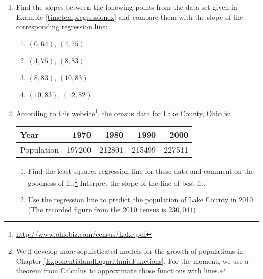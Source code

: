 \begin{enumerate}

\setcounter{enumi}{\value{HW}}

\item  Find the slopes between the following points from the data set given in Example \ref{timetempregressionex} and compare them with the slope of the corresponding regression line:

\begin{multicols}{4}

\begin{enumerate}

\item  $(0, 64)$, $(4, 75)$

\item  $(4, 75)$, $(8, 83)$

\item  $(8, 83)$, $(10, 83)$

\item  $(10, 83)$, $(12, 82)$

\end{enumerate}

\end{multicols}

\item According to this \href{http://www.ohiobiz.com/census/Lake.pdf}{\underline{website}}\footnote{\href{http://www.ohiobiz.com/census/Lake.pdf}{\underline{http://www.ohiobiz.com/census/Lake.pdf}}}, the census data for Lake County, Ohio is:

\noindent \begin{tabular}{|l|r|r|r|r|} \hline
Year & 1970 & 1980 & 1990 & 2000 \\ 
\hline 
Population & 197200 & 212801 & 215499 & 227511 \\ \hline
\end{tabular}

\begin{enumerate}
 

\item  Find the least squares regression line for these data and comment on the goodness of fit.\footnote{We'll develop more sophisticated models for the growth of populations in Chapter \ref{ExponentialandLogarithmicFunctions}.  For the moment, we use a theorem from Calculus to approximate those functions with lines.} Interpret the slope of the line of best fit.

\item  Use the regression line to predict the population of Lake County in 2010.  (The recorded figure from the 2010 census is $230,\!041$)


\end{enumerate}
\end{enumerate}
